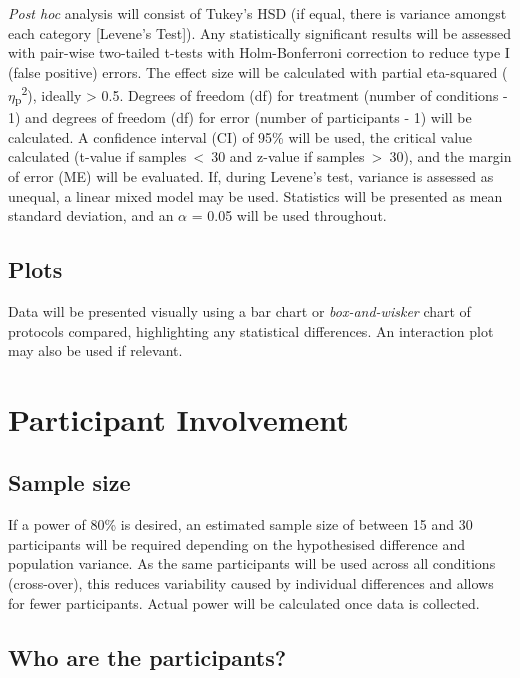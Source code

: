 \documentclass[stu, floatsintext, a4paper]{apa7}
\begin{document}
\emph{Post hoc} analysis will consist of Tukey's HSD (if equal, there is variance amongst each category [Levene's Test]). Any statistically significant results will be assessed with pair-wise two-tailed t-tests with Holm-Bonferroni correction to reduce type I (false positive) errors. The effect size will be calculated with partial eta-squared (\(\eta\)\textsubscript{p}\textsuperscript{2}), ideally > 0.5. Degrees of freedom (df) for treatment (number of conditions - 1) and degrees of freedom (df) for error (number of participants - 1) will be calculated. A confidence interval (CI) of 95\% will be used, the critical value calculated (t-value if samples~<~30 and z-value if samples~>~30), and the margin of error (ME) will be evaluated. If, during Levene's test, variance is assessed as unequal, a linear mixed model may be used. Statistics will be presented as mean \textpm{} standard deviation, and an \(\alpha\) = 0.05 will be used throughout.

\subsection{Plots}
\label{sec:org356071f}

Data will be presented visually using a bar chart or \emph{box-and-wisker} chart of protocols compared, highlighting any statistical differences. An interaction plot may also be used if relevant.

\section{Participant Involvement}
\label{sec:org6202d05}

\subsection{Sample size}
\label{sec:org2c6f599}

If a power of 80\% is desired, an estimated sample size of between 15 and 30 participants will be required depending on the hypothesised difference and population variance. As the same participants will be used across all conditions (cross-over), this reduces variability caused by individual differences and allows for fewer participants. Actual power will be calculated once data is collected.

\subsection{Who are the participants?}
\label{sec:org81d4d6c}
\end{document}
